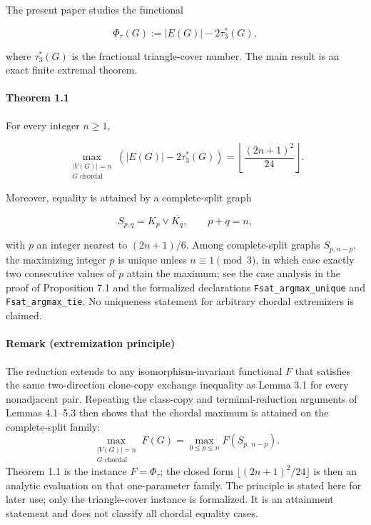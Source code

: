 \documentclass[
  american,
  11pt,
  a4paper,
]{article}
\begin{document}
The present paper studies the functional

\[
\Phi_\tau(G):=|E(G)|-2\tau_3^*(G),
\]

where \(\tau_3^*(G)\) is the fractional triangle-cover number. The main result is an exact finite extremal theorem.

\paragraph{Theorem 1.1}\label{theorem-1.1}

For every integer \(n\ge1\),

\[
\boxed{
\max_{\substack{|V(G)|=n\\G\text{ chordal}}}
\left(
|E(G)|-2\tau_3^*(G)
\right)
=
\left\lfloor\frac{(2n+1)^2}{24}\right\rfloor.
}
\]

Moreover, equality is attained by a complete-split graph

\[
S_{p,q}=K_p\vee\overline{K_q},
\qquad
p+q=n,
\]

with \(p\) an integer nearest to \((2n+1)/6\). Among complete-split graphs \(S_{p,n-p}\), the maximizing integer \(p\) is unique unless \(n\equiv1\pmod3\), in which case exactly two consecutive values of \(p\) attain the maximum; see the case analysis in the proof of Proposition 7.1 and the formalized declarations \texttt{Fsat\_argmax\_unique} and \texttt{Fsat\_argmax\_tie}. No uniqueness statement for arbitrary chordal extremizers is claimed.

\paragraph{Remark (extremization principle)}\label{remark-extremization-principle}

The reduction extends to any isomorphism-invariant functional \(F\) that satisfies the same two-direction clone-copy exchange inequality as Lemma 3.1 for every nonadjacent pair. Repeating the class-copy and terminal-reduction arguments of Lemmas 4.1--5.3 then shows that the chordal maximum is attained on the complete-split family:
\[
\max_{\substack{|V(G)|=n\\ G\text{ chordal}}}F(G)=\max_{0\le p\le n}F(S_{p,\,n-p}).
\]
Theorem 1.1 is the instance \(F=\Phi_\tau\); the closed form \(\lfloor(2n+1)^2/24\rfloor\) is then an analytic evaluation on that one-parameter family. The principle is stated here for later use; only the triangle-cover instance is formalized. It is an attainment statement and does not classify all chordal equality cases.
\end{document}
